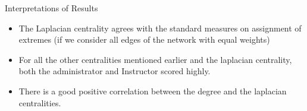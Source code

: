 \documentclass[10pt]{beamer}
\begin{document}
\begin{frame}{Interpretations of Results}
	\begin{block}{}
		\begin{itemize}
			\item The Laplacian centrality agrees with the standard measures on assignment of extremes (if we consider all edges of the network with equal weights)
			\pause
			\item For all the other centralities mentioned earlier and the laplacian centrality, both the administrator and Instructor scored highly.
			\vspace{0.5cm}
			\pause
			\item There is a good positive correlation between the degree and the laplacian centralities.
		\end{itemize}
	\end{block}
\end{frame}
\end{document}
